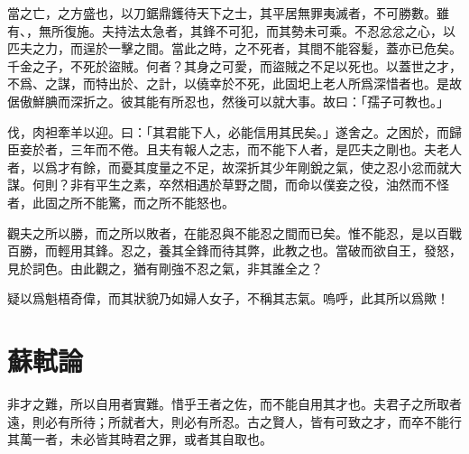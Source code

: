 當之亡，之方盛也，以刀鋸鼎鑊待天下之士，其平居無{罪}夷滅者，不可勝數。雖有、，無所{復}施。夫持法太急者，其鋒不可犯，而其勢未可乘。不忍忿忿之心，以匹夫之力，而逞於一擊之間。當此之時，之不死者，其間不能容髪，蓋亦已危矣。千金之子，不死於盜賊。何者？其身之可愛，而盜賊之不足以死也。以蓋世之才，不爲、之謀，而特出於、之計，以僥幸於不死，此固圯上老人所爲深惜者也。是故倨傲鮮腆而深折之。彼其能有所忍也，然後可以就大事。故曰：「孺子可教也。」%

伐，肉袒牽羊以迎。曰：「其{君}能下人，必能信用其民矣。」遂舍之。之困於，而歸臣妾於者，三年而不倦。且夫有報人之志，而不能下人者，是匹夫之剛也。夫老人者，以爲才有餘，而憂其度量之不足，故深折其少年剛銳之氣，使之忍小忿而就大謀。何則？非有平生之素，卒然相遇於草野之間，而命以僕妾之役，油然而不怪者，此固之所不能驚，而之所不能怒也。%

觀夫之所以勝，而之所以敗者，在能忍與不能忍之間而已矣。惟不能忍，是以百戰百勝，而輕用其鋒。忍之，養其全鋒而待其{弊}，此教之也。當破而欲自王，發怒，見於詞色。由此觀之，猶有剛強不忍之氣，非其誰全之？%

疑以爲魁梧奇偉，而其狀貌乃如婦人女子，不稱其志氣。嗚呼，此其所以爲歟！

\theendnotes

\section[賈誼論\quad{\small 蘇軾}]{{\normalsize 蘇軾}\quad{}論}
非才之難，所以自用者實難。惜乎王者之佐，而不能自用其才也。夫君子之所取者遠，則必有所待；所就者大，則必有所忍。古之賢人，皆有可致之才，而卒不能行其萬一者，未必皆其時君之罪，或者其自取也。


